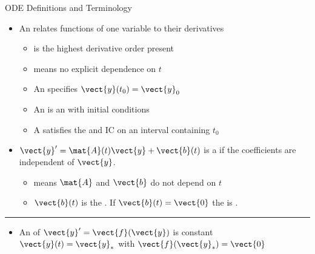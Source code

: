\begin{frame}{ODE Definitions and Terminology}
\begin{itemize}
  \item An  relates functions of one variable to their derivatives
  \begin{itemize}
  \item {} is the highest derivative order present
  \item {} means no explicit dependence on $t$
  \item An  specifies $\vect{y}(t_0)=\vect{y}_0$
  \item An  is an  with initial conditions
  \item A  satisfies the  and IC on an interval containing $t_0$
  \end{itemize}
  \item $\vect{y}'=\mat{A}(t)\vect{y}+\vect{b}(t)$
  is a  if the  coefficients are independent of $\vect{y}$.
  \begin{itemize}
  	\item {} means $\mat{A}$ and $\vect{b}$ do not depend on $t$
  \item $\vect{b}(t)$ is the . If
  $\vect{b}(t)=\vect{0}$ the  is .  
    \end{itemize}
\end{itemize}
\vspace{4pt}\hrule\vspace{4pt}
\begin{itemize}
  \item An  of $\vect{y}'=\vect{f}(\vect{y})$ is constant $\vect{y}(t)=\vect{y}_*$ with $\vect{f}(\vect{y}_*)=\vect{0}$
\end{itemize}
\end{frame}
